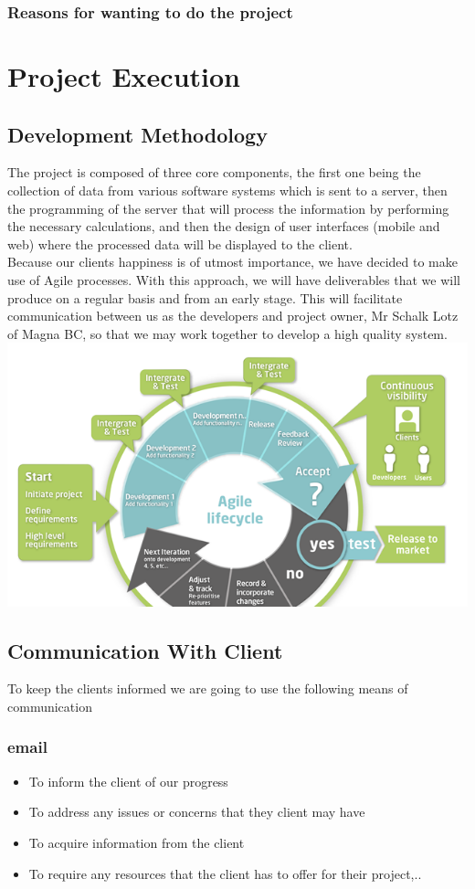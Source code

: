 \documentclass[a4paper,12pt]{article}
\begin{document}
\subsubsection{Reasons for wanting to do the project}
\section{Project Execution}
\subsection{Development Methodology}
The project is composed of three core components, the first one being the collection of data from various software systems which is sent to a server, then the programming of the server that will process the information by performing the necessary calculations, and then the design of user interfaces (mobile and web) where the processed data will be displayed to the client.\\
Because our clients happiness is of utmost importance, we have decided to make use of Agile processes. With this approach, we will have deliverables that we will produce on a regular basis and from an early stage. This will facilitate communication between us as the developers and project owner, Mr Schalk Lotz of Magna BC, so that we may work together to develop a high quality system.\\
\includegraphics[width=\textwidth]{images/agileDev.png}
\subsection{Communication With Client}
To keep the clients informed we are going to use the following means of communication
\subsubsection{email}
\begin{itemize}
\item To inform the client of our progress
\item To address any issues or concerns that they client may have
\item To acquire information from the client
\item To require any resources that the client has to offer for their project,..
\end{itemize}
\end{document}
